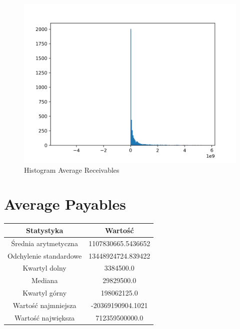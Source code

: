 \documentclass{article}
\begin{document}
\begin{figure}[h!]
    \includegraphics[width=\linewidth]{variables/Average Receivables.png}
    \caption{Histogram Average Receivables }
\end{figure}\section{ Average Payables }

\begin{center}
    \begin{tabular}{|c | c|} 
    \hline
    Statystyka & Wartość \\
    \hline\hline
    Średnia arytmetyczna & 1107830665.5436652 \\ 
    \hline
    Odchylenie standardowe & 13448924724.839422 \\
    \hline
    Kwartyl dolny & 3384500.0 \\
    \hline
    Mediana & 29829500.0 \\
    \hline
    Kwartyl górny & 198062125.0 \\
    \hline
    Wartość najmniejsza & -20369190904.1021 \\
    \hline
    Wartość największa & 712359500000.0 \\
    \hline
   \end{tabular}
\end{center}
\end{document}
